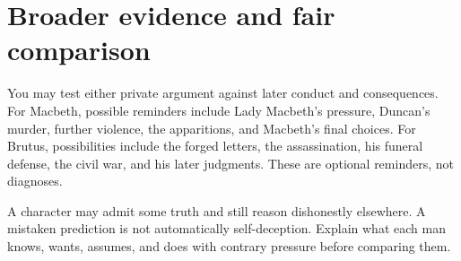 \documentclass[11pt]{article}
\begin{document}
\section*{Broader evidence and fair comparison}
You may test either private argument against later conduct and consequences. For Macbeth, possible reminders include Lady Macbeth's pressure, Duncan's murder, further violence, the apparitions, and Macbeth's final choices. For Brutus, possibilities include the forged letters, the assassination, his funeral defense, the civil war, and his later judgments. These are optional reminders, not diagnoses.

A character may admit some truth and still reason dishonestly elsewhere. A mistaken prediction is not automatically self-deception. Explain what each man knows, wants, assumes, and does with contrary pressure before comparing them.
\end{document}
